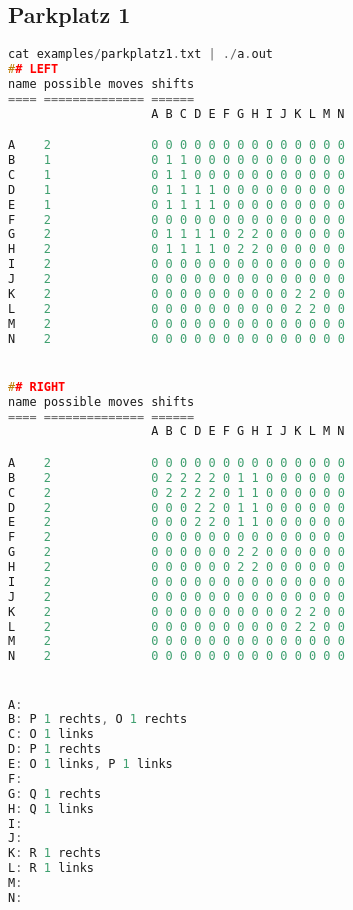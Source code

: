 \documentclass[a4paper,10pt,ngerman]{scrartcl}
\begin{document}
\subsection*{Parkplatz 1}
\begin{lstlisting}[language=C++]
cat examples/parkplatz1.txt | ./a.out
## LEFT
name possible moves shifts
==== ============== ======
                    A B C D E F G H I J K L M N

A    2              0 0 0 0 0 0 0 0 0 0 0 0 0 0
B    1              0 1 1 0 0 0 0 0 0 0 0 0 0 0
C    1              0 1 1 0 0 0 0 0 0 0 0 0 0 0
D    1              0 1 1 1 1 0 0 0 0 0 0 0 0 0
E    1              0 1 1 1 1 0 0 0 0 0 0 0 0 0
F    2              0 0 0 0 0 0 0 0 0 0 0 0 0 0
G    2              0 1 1 1 1 0 2 2 0 0 0 0 0 0
H    2              0 1 1 1 1 0 2 2 0 0 0 0 0 0
I    2              0 0 0 0 0 0 0 0 0 0 0 0 0 0
J    2              0 0 0 0 0 0 0 0 0 0 0 0 0 0
K    2              0 0 0 0 0 0 0 0 0 0 2 2 0 0
L    2              0 0 0 0 0 0 0 0 0 0 2 2 0 0
M    2              0 0 0 0 0 0 0 0 0 0 0 0 0 0
N    2              0 0 0 0 0 0 0 0 0 0 0 0 0 0


## RIGHT
name possible moves shifts
==== ============== ======
                    A B C D E F G H I J K L M N

A    2              0 0 0 0 0 0 0 0 0 0 0 0 0 0
B    2              0 2 2 2 2 0 1 1 0 0 0 0 0 0
C    2              0 2 2 2 2 0 1 1 0 0 0 0 0 0
D    2              0 0 0 2 2 0 1 1 0 0 0 0 0 0
E    2              0 0 0 2 2 0 1 1 0 0 0 0 0 0
F    2              0 0 0 0 0 0 0 0 0 0 0 0 0 0
G    2              0 0 0 0 0 0 2 2 0 0 0 0 0 0
H    2              0 0 0 0 0 0 2 2 0 0 0 0 0 0
I    2              0 0 0 0 0 0 0 0 0 0 0 0 0 0
J    2              0 0 0 0 0 0 0 0 0 0 0 0 0 0
K    2              0 0 0 0 0 0 0 0 0 0 2 2 0 0
L    2              0 0 0 0 0 0 0 0 0 0 2 2 0 0
M    2              0 0 0 0 0 0 0 0 0 0 0 0 0 0
N    2              0 0 0 0 0 0 0 0 0 0 0 0 0 0


A:
B: P 1 rechts, O 1 rechts
C: O 1 links
D: P 1 rechts
E: O 1 links, P 1 links
F:
G: Q 1 rechts
H: Q 1 links
I:
J:
K: R 1 rechts
L: R 1 links
M:
N:
\end{lstlisting}
\end{document}
